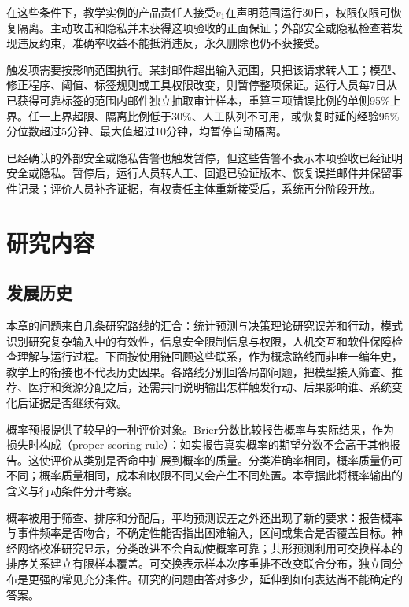 在这些条件下，教学实例的产品责任人接受$v_1$在声明范围运行30日，权限仅限可恢复隔离。主动攻击和隐私并未获得这项验收的正面保证；外部安全或隐私检查若发现违反约束，准确率收益不能抵消违反，永久删除也仍不获接受。

触发项需要按影响范围执行。某封邮件超出输入范围，只把该请求转人工；模型、修正程序、阈值、标签规则或工具权限改变，则暂停整项保证。运行人员每7日从已获得可靠标签的范围内邮件独立抽取审计样本，重算三项错误比例的单侧95\%上界。任一上界超限、隔离比例低于30\%、人工队列不可用，或恢复时延的经验95\%分位数超过5分钟、最大值超过10分钟，均暂停自动隔离。

已经确认的外部安全或隐私告警也触发暂停，但这些告警不表示本项验收已经证明安全或隐私。暂停后，运行人员转人工、回退已验证版本、恢复误拦邮件并保留事件记录；评价人员补齐证据，有权责任主体重新接受后，系统再分阶段开放。

\section{研究内容}
\label{sec:trust-research-content}

\subsection{发展历史}

本章的问题来自几条研究路线的汇合：统计预测与决策理论研究误差和行动，模式识别研究复杂输入中的有效性，信息安全限制信息与权限，人机交互和软件保障检查理解与运行过程。下面按使用链回顾这些联系，作为概念路线而非唯一编年史，教学上的衔接也不代表历史因果。各路线分别回答局部问题，把模型接入筛查、推荐、医疗和资源分配之后，还需共同说明输出怎样触发行动、后果影响谁、系统变化后证据是否继续有效。

概率预报提供了较早的一种评价对象。Brier分数比较报告概率与实际结果，作为损失时构成（proper scoring rule）：如实报告真实概率的期望分数不会高于其他报告。这使评价从类别是否命中扩展到概率的质量。分类准确率相同，概率质量仍可不同；概率质量相同，成本和权限不同又会产生不同处置。本章据此将概率输出的含义与行动条件分开考察。

概率被用于筛查、排序和分配后，平均预测误差之外还出现了新的要求：报告概率与事件频率是否吻合，不确定性能否指出困难输入，区间或集合是否覆盖目标。神经网络校准研究显示，分类改进不会自动使概率可靠；共形预测利用可交换样本的排序关系建立有限样本覆盖。可交换表示样本次序重排不改变联合分布，独立同分布是更强的常见充分条件。研究的问题由答对多少，延伸到如何表达尚不能确定的答案。

